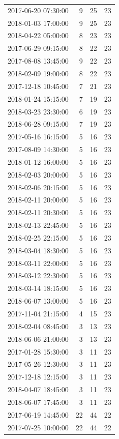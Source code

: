 \begin{tabular}{lrrr}
2017-06-20 07:30:00 & 9 & 25 & 23 \\
2018-01-03 17:00:00 & 9 & 25 & 23 \\
2018-04-22 05:00:00 & 8 & 23 & 23 \\
2017-06-29 09:15:00 & 8 & 22 & 23 \\
2017-08-08 13:45:00 & 9 & 22 & 23 \\
2018-02-09 19:00:00 & 8 & 22 & 23 \\
2017-12-18 10:45:00 & 7 & 21 & 23 \\
2018-01-24 15:15:00 & 7 & 19 & 23 \\
2018-03-23 23:30:00 & 6 & 19 & 23 \\
2018-06-28 09:15:00 & 7 & 19 & 23 \\
2017-05-16 16:15:00 & 5 & 16 & 23 \\
2017-08-09 14:30:00 & 5 & 16 & 23 \\
2018-01-12 16:00:00 & 5 & 16 & 23 \\
2018-02-03 20:00:00 & 5 & 16 & 23 \\
2018-02-06 20:15:00 & 5 & 16 & 23 \\
2018-02-11 20:00:00 & 5 & 16 & 23 \\
2018-02-11 20:30:00 & 5 & 16 & 23 \\
2018-02-13 22:45:00 & 5 & 16 & 23 \\
2018-02-25 22:15:00 & 5 & 16 & 23 \\
2018-03-04 18:30:00 & 5 & 16 & 23 \\
2018-03-11 22:00:00 & 5 & 16 & 23 \\
2018-03-12 22:30:00 & 5 & 16 & 23 \\
2018-03-14 18:15:00 & 5 & 16 & 23 \\
2018-06-07 13:00:00 & 5 & 16 & 23 \\
2017-11-04 21:15:00 & 4 & 15 & 23 \\
2018-02-04 08:45:00 & 3 & 13 & 23 \\
2018-06-06 21:00:00 & 3 & 13 & 23 \\
2017-01-28 15:30:00 & 3 & 11 & 23 \\
2017-05-26 12:30:00 & 3 & 11 & 23 \\
2017-12-18 12:15:00 & 3 & 11 & 23 \\
2018-04-07 18:45:00 & 3 & 11 & 23 \\
2018-06-07 17:45:00 & 3 & 11 & 23 \\
2017-06-19 14:45:00 & 22 & 44 & 22 \\
2017-07-25 10:00:00 & 22 & 44 & 22 \\

\end{tabular}

